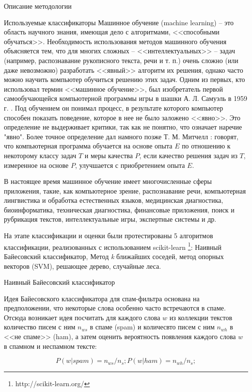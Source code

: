 \begin{section}{Описание методологии}
\begin{subsection}{Используемые классификаторы}
    Машинное обучение (machine learning) – это область научного знания, имеющая дело с алгоритмами, <<способными обучаться>>. Необходимость использования методов машинного обучения объясняется тем, что для многих сложных – <<интеллектуальных>> – задач (например, распознавание рукописного текста, речи и т. п.) очень сложно (или даже невозможно) разработать <<явный>> алгоритм их решения, однако часто можно научить компьютер обучиться решению этих задач. Одним из первых, кто использовал термин <<машинное обучение>>, был изобретатель первой самообучающейся компьютерной программы игры в шашки А. Л. Самуэль в 1959 г. \cite{Samuel}. Под обучением он понимал процесс, в результате которого компьютер способен показать поведение, которое в нее не было заложено <<явно>>. Это определение не выдерживает критики, так как не понятно, что означает наречие "явно". Более точное определение дал намного позже Т. М. Митчелл \cite{Mitchell}: говорят, что компьютерная программа обучается на основе опыта $E$ по отношению к некоторому классу задач $T$ и меры качества $P$, если качество решения задач из $T$, измеренное на основе $P$, улучшается с приобретением опыта $E$.

    В настоящее время машинное обучение имеет многочисленные сферы приложения, такие, как компьютерное зрение, распознавание речи, компьютерная лингвистика и обработка естественных языков, медицинская диагностика, биоинформатика, техническая диагностика, финансовые приложения, поиск и рубрикация текстов, интеллектуальные игры, экспертные системы и др.


    На этапе классификации и оценки были протестированы 5 алгоритмов классификации, реализованных с использованием scikit-learn \footnote{http://scikit-learn.org/}: Наивный Байесовский классификатор,
    Метод \textit{k} ближайших соседей, метод опорных векторов (SVM), решающее дерево, случайные леса.

    \begin{subsubsection}{Наивный Байесовский классификатор}

Идея Байесовского классификатора для спам-фильтра основана на предположении,
что некоторые слова особенно часто встречаются в спаме. Отсюда возникает идея посчитать для каждого слова $w$ из коллекции текстов количество писем с ним $n_{ws}$
в спаме (spam) и количесвто писем с ним $n_{wh}$ в <<не спаме>> (ham), а затем оценить вероятность появления каждого слова $w$ в спамном и неспамном тексте:

\begin{equation}
  P(w|spam) = n_{ws}/n_s; P(w|ham) = n_{wh}/n_s;
\end{equation}


\end{subsubsection}
\end{subsection}
\end{section}
